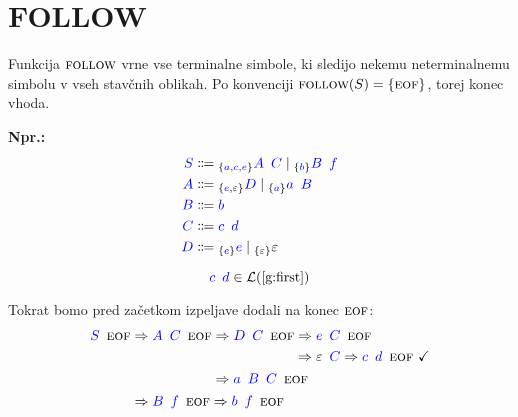 \documentclass{article}
\newcommand{\Ex}{\textbf{Npr.:}\ }
\newcommand{\OK}{\ \checkmark}
\newcommand{\FOLLOW}{\textsc{follow}}
\newcommand{\EOF}{\textsc{eof}}
\newcommand{\Symbol}[1]{\textcolor{blue}{#1}}
\newcommand{\Null}{\varepsilon}
\newcommand{\Language}[1]{\mathcal{L}(#1)}
\newcommand{\MathRef}[1]{\text{\ref{#1}}}
\newcommand{\Arrow}{\Coloneq}
\newcommand{\Derive}{\Rightarrow}
\newcommand{\Seq}{{\ \,}}
\newcommand{\Union}{\mathrel{|}}
\newcommand{\Lookahead}[1]{{}_{\{{#1}\}}}
\begin{document}

\section{FOLLOW}
Funkcija $\FOLLOW$ vrne vse terminalne simbole, ki sledijo nekemu neterminalnemu simbolu v vseh stavčnih oblikah.
Po konvenciji $\FOLLOW(S) = \{\EOF\}$, torej konec vhoda.

\Ex
\begin{equation*}
  \begin{aligned}
    \Symbol{S} &\Arrow \Lookahead{\Symbol{a}, \Symbol{c}, \Symbol{e}} \Symbol{A} \Seq \Symbol{C} \Union \Lookahead{\Symbol{b}} \Symbol{B} \Seq \Symbol{f} \\
    \Symbol{A} &\Arrow \Lookahead{\Symbol{e}, \Null} \Symbol{D} \Union \Lookahead{\Symbol{a}} \Symbol{a} \Seq \Symbol{B} \\
    \Symbol{B} &\Arrow \Symbol{b}\\
    \Symbol{C} &\Arrow \Symbol{c} \Seq \Symbol{d}\\
    \Symbol{D} &\Arrow \Lookahead{\Symbol{e}} \Symbol{e} \Union \Lookahead{\Null} \Null
  \end{aligned}
\end{equation*}

\begin{equation*}
  \Symbol{c} \Seq \Symbol{d} \in \Language{\MathRef{g:first}}
\end{equation*}

Tokrat bomo pred začetkom izpeljave dodali na konec $\EOF$:
\begin{equation*}
  \Symbol{S} \Seq \EOF \begin{aligned}[t]
    &\Derive \Symbol{A} \Seq \Symbol{C} \Seq \EOF \begin{aligned}[t]
      &\Derive \Symbol{D} \Seq \Symbol{C} \Seq \EOF \begin{aligned}[t]
        &\Derive \Symbol{e} \Seq \Symbol{C} \Seq \EOF\\
        &\Derive \Null \Seq \Symbol{C} \Derive \Symbol{c} \Seq \Symbol{d} \Seq \EOF \OK
      \end{aligned}\\
      &\Derive \Symbol{a} \Seq \Symbol{B} \Seq \Symbol{C} \Seq \EOF
    \end{aligned}\\
    &\Derive \Symbol{B} \Seq \Symbol{f} \Seq \EOF \Derive \Symbol{b} \Seq \Symbol{f} \Seq \EOF
  \end{aligned}
\end{equation*}
\end{document}
